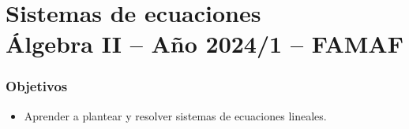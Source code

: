 \chapter{Sistemas de ecuaciones\\Álgebra  II -- Año 2024/1 -- FAMAF}\label{practico-2}

\centerline{\textsc{}}

\subsection*{Objetivos}

\begin{itemize}
 \item Aprender a plantear y resolver sistemas de ecuaciones lineales.
\end{itemize}

